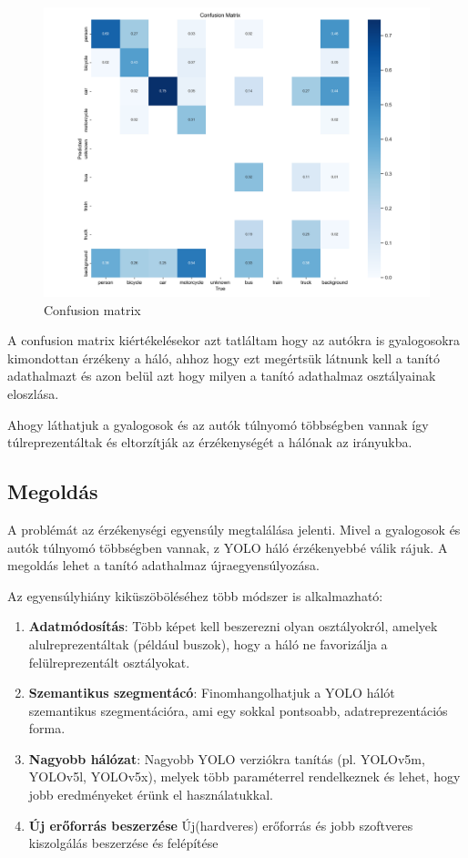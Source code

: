 \documentclass[12pt,oneside,a4paper]{article}
\theoremstyle{remark}
\begin{document}
\begin{figure} [ht]
    \centering
    \includegraphics[width=0.9\linewidth]{confusion_matrix}
    \caption{Confusion matrix}
    \label{fig:confusion}
\end{figure}
\newpage
A confusion matrix kiértékelésekor azt tatláltam hogy az autókra is gyalogosokra kimondottan érzékeny a háló,
ahhoz hogy ezt megértsük látnunk kell a tanító adathalmazt és azon belül azt hogy milyen a tanító adathalmaz osztályainak eloszlása.

Ahogy láthatjuk a gyalogosok és az autók túlnyomó többségben vannak így túlreprezentáltak és eltorzítják az
érzékenységét a hálónak az irányukba.

\subsection{Megoldás}\label{subsec:megoldas}
A problémát az érzékenységi egyensúly megtalálása jelenti.
Mivel a gyalogosok és autók túlnyomó többségben
vannak, z YOLO háló érzékenyebbé válik rájuk.
A megoldás lehet a tanító adathalmaz újraegyensúlyozása.

Az egyensúlyhiány kiküszöböléséhez több módszer is alkalmazható:
\begin{enumerate}\label{célok}
    \item \textbf{Adatmódosítás}: Több képet kell beszerezni olyan osztályokról, amelyek alulreprezentáltak (például buszok),
hogy a háló ne favorizálja a felülreprezentált osztályokat.
    \item \textbf{ Szemantikus szegmentácó}: Finomhangolhatjuk a YOLO hálót szemantikus szegmentációra, ami egy sokkal pontsoabb,
    adatreprezentációs forma.
    \item  \textbf{Nagyobb hálózat}: Nagyobb YOLO verziókra tanítás (pl. YOLOv5m, YOLOv5l, YOLOv5x),
melyek több paraméterrel rendelkeznek és lehet, hogy jobb eredményeket érünk el használatukkal.
    \item  \textbf{Új erőforrás beszerzése} Új(hardveres) erőforrás és jobb szoftveres kiszolgálás beszerzése és felépítése
\end{enumerate}
\end{document}
